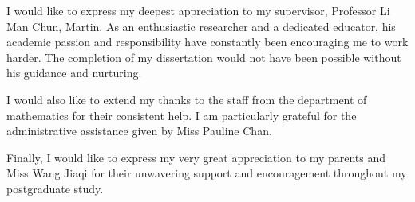 I would like to express my deepest appreciation to my supervisor, Professor Li Man Chun, Martin. As an enthusiastic researcher and a dedicated educator, his academic passion and responsibility have constantly been encouraging me to work harder. The completion of my dissertation would not have been possible without his guidance and nurturing.

I would also like to extend my thanks to the staff from the department of mathematics for their consistent help. I am particularly grateful for the administrative assistance given by Miss Pauline Chan.

Finally, I would like to express my very great appreciation to my parents and Miss Wang Jiaqi for their unwavering support and encouragement throughout my postgraduate study.


